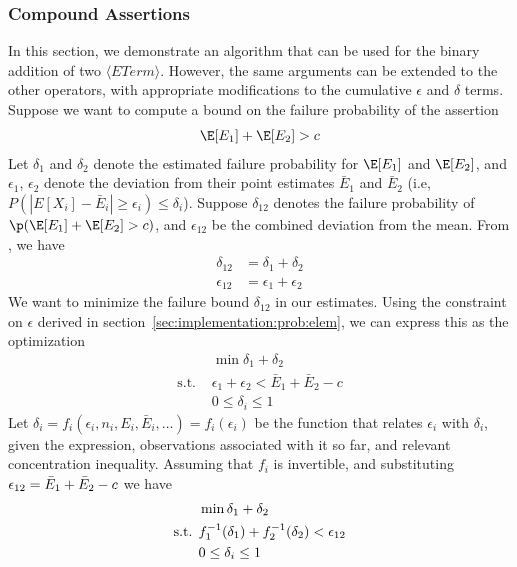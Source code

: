 \subsubsection{Compound Assertions}
\label{sec:implementation:prob:comp}
In this section, we demonstrate an algorithm that can be used for the binary addition of two $\langle ETerm \rangle$. 
However, the same arguments can be extended to the other operators, with appropriate modifications to the cumulative $\epsilon$ and $\delta$ terms.
Suppose we want to compute a bound on the failure probability of the assertion
\begin{align*}
    \E[E_1] + \E[E_2] > c
\end{align*}
Let $\delta_1$ and $\delta_2$ denote the estimated failure probability for $\E[E_1]$ and $\E[E_2]$, and $\epsilon_1$, $\epsilon_2$ denote the deviation from their point estimates $\bar{E}_1$ and $\bar{E}_2$ (i.e, $P(|E[X_i] - \bar{E}_i| \geq \epsilon_i) \leq \delta_i$). 
Suppose $\delta_{12}$ denotes the failure probability of $\p(\E[E_1] + \E[E_2] > c)$, and $\epsilon_{12}$ be the combined deviation from the mean.
From \cite{albarghouthi2019fairness}, we have 
\begin{align*}
    \delta_{12} &= \delta_1 + \delta_2 \\
    \epsilon_{12} &= \epsilon_1 + \epsilon_2
\end{align*}
We want to minimize the failure bound $\delta_{12}$ in our estimates.
Using the constraint on $\epsilon$ derived in section~\ref{sec:implementation:prob:elem}, we can express this as the optimization 
\begin{align*}
    &\min{\delta_1 + \delta_2} \\
    \text{s.t.  } &\epsilon_1 + \epsilon_2 < \bar{E}_1 + \bar{E}_2 - c\\
    & 0\leq \delta_i \leq 1
\end{align*}
Let $\delta_i = f_i(\epsilon_i, n_i, E_i, \bar{E}_i, \dots) = f_i(\epsilon_i)$ be the function that relates $\epsilon_i$ with $\delta_i$, given the expression, observations associated with it so far, and relevant concentration inequality. Assuming that $f_i$ is invertible, and substituting $\epsilon_{12} =  \bar{E}_1 + \bar{E}_2 - c$ we have
\begin{align*}
     &\min{\delta_1 + \delta_2} \\
    \text{s.t.  } & f_1^{-1}(\delta_1) + f_2^{-1}(\delta_2) < \epsilon_{12}\\
    & 0\leq \delta_i \leq 1
\end{align*}

